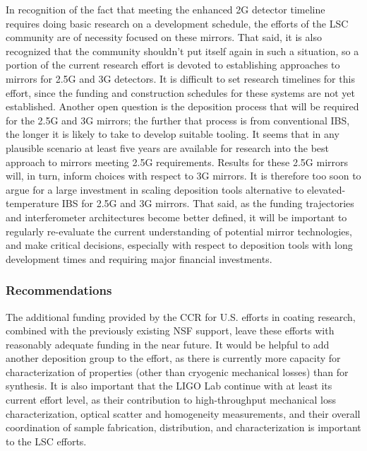 In recognition of the fact that meeting the enhanced 2G detector timeline requires doing basic research on a development schedule, the efforts of the LSC community are of necessity focused on these mirrors. That said, it is also recognized that the community shouldn't put itself again in such a situation, so a portion of the current research effort is devoted to establishing approaches to mirrors for 2.5G and 3G detectors. It is difficult to set research timelines for this effort, since the funding and construction schedules for these systems are not yet established. Another open question is the deposition process that will be required for the 2.5G and 3G mirrors; the further that process is from conventional IBS, the longer it is likely to take to develop suitable tooling. It seems that in any plausible scenario at least five years are available for research into the best approach to mirrors meeting 2.5G requirements. Results for these 2.5G mirrors will, in turn, inform choices with respect to 3G mirrors. It is therefore too soon to argue for a large investment in scaling deposition tools alternative to elevated-temperature IBS for 2.5G and 3G mirrors. That said, as the funding trajectories and interferometer architectures become better defined, it will be important to regularly re-evaluate the current understanding of potential mirror technologies, and make critical decisions, especially with respect to deposition tools with long development times and requiring major financial investments.

\subsubsection{Recommendations}

\noindent The additional funding provided by the CCR for U.S. efforts in coating research, combined with the previously existing NSF support, leave these efforts with reasonably adequate funding in the near future. It would be helpful to add another deposition group to the effort, as there is currently more capacity for characterization of properties (other than cryogenic mechanical losses) than for synthesis. It is also important that the LIGO Lab continue with at least its current effort level, as their contribution to high-throughput mechanical loss characterization, optical scatter and homogeneity measurements, and their overall coordination of sample fabrication, distribution, and characterization is important to the LSC efforts.

